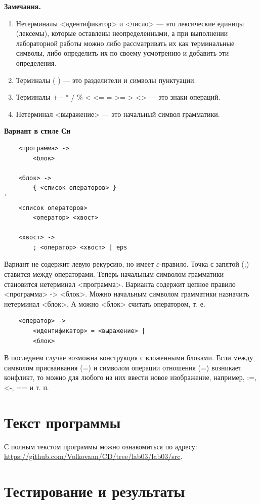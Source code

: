 \documentclass{bmstu-gost-7-32}
\begin{document}
\textbf{Замечания.}

\begin{enumerate}
	\item Нетерминалы <идентификатор> и <число> — это лексические единицы (лексемы), которые оставлены неопределенными, а при выполнении лабораторной работы можно либо рассматривать их как терминальные символы, либо определить их по своему усмотрению и добавить эти определения.
	\item Терминалы ( ) — это разделители и символы пунктуации.
	\item Терминалы + - * / \% < <= = >= > <> — это знаки операций.
	\item Нетерминал <выражение> — это начальный символ грамматики.
\end{enumerate}

\textbf{Вариант в стиле Си}

\begin{verbatim}
	<программа> ->
	    <блок>

	<блок> ->
	    { <список операторов> }
`
	<список операторов>
	    <оператор> <хвост>

	<хвост> ->
	    ; <оператор> <хвост> | eps
\end{verbatim}

Вариант не содержит левую рекурсию, но имеет $\varepsilon$-правило.
Точка с запятой (;) ставится между операторами.
Теперь начальным символом грамматики становится нетерминал <программа>.
Варианта содержит цепное правило <программа> -> <блок>.
Можно начальным символом грамматики назначить нетерминал <блок>. А можно <блок> считать оператором, т. е.

\begin{verbatim}
	<оператор> ->
	    <идентификатор> = <выражение> |
	    <блок>
\end{verbatim}

В последнем случае возможна конструкция с вложенными блоками.
Если между символом присваивания (=) и символом операции отношения (=) возникает конфликт, то можно для любого из них ввести новое изображение, например, :=, <-, == и т. п.

\section*{Текст программы}

С полным текстом программы можно ознакомиться по адресу: \url{https://github.com/Volkovaan/CD/tree/lab03/lab03/src}.

\section*{Тестирование и результаты}
\end{document}
